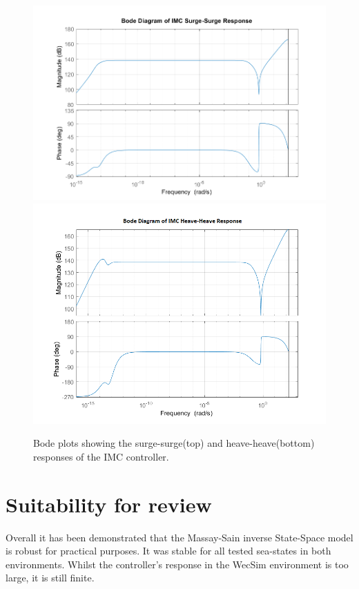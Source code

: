 \documentclass{report}
\begin{document}
\begin{figure}
\centering
\includegraphics[scale=0.5]{graphs/IMCBodeSurge}
\includegraphics[scale=0.5]{graphs/IMCBodeHeave}
\caption{Bode plots showing the surge-surge(top) and heave-heave(bottom) responses of the IMC controller.}
\label{IMCBode}
\end{figure} 

\FloatBarrier
\section{Suitability for review}
Overall it has been demonstrated that the Massay-Sain inverse State-Space model is robust for practical purposes. It was stable for all tested sea-states in both environments. Whilst the controller's response in the WecSim environment is too large, it is still finite.
\end{document}

